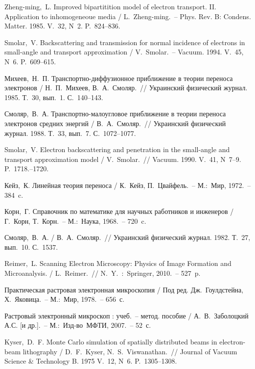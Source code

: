 \def\bibname{СИСОК ИСПОЛЬЗОВАННЫХ ИСТОЧНИКОВ}
\begin{thebibliography}{99}  

 Zheng-ming,~L. Improved bipartitition model of electron
transport. II. Application to inhomogeneoue media / L.~Zheng-ming.~-- Phys. Rev. B:
Condens. Matter. 1985. V.~32, N~2. P.~824--836.

 Smolar,~V. Backscattering and transmission for normal
incidence of electrons in small-angle and transport approximation /
V.~Smolar.~-- Vacuum. 1994. V.~45, N~6. P.~609--615.

 Михеев,~Н.~П. Транспортно-диффузионное приближение в теории
переноса электронов / Н.~П.~Михеев, В.~А.~Смоляр.~// Украинский физический
журнал. 1985. Т.~30, вып.~1. С.~140--143.

 Смоляр,~В.~А. Транспортно-малоугловое приближение в теории
переноса электронов средних энергий / В.~А.~Смоляр.~// Украинский физический
журнал. 1988. Т.~33, вып.~7. С.~1072--1077.

 Smolar,~V. Electron backscattering and penetration in the
small-angle and transport approximation model / V.~Smolar.~// Vacuum. 1990.
V.~41, N~7--9. P.~1718.--1720.

 Кейз,~К. Линейная теория переноса / К.~Кейз, П.~Цвайфель.~--
М.:~Мир, 1972.~-- 384~c.

 Корн,~Г. Справочник по математике для научных работников и
инженеров /  Г.~Корн, Т.~Корн.~-- М.:~Наука, 1968.~-- 720~c.

 Смоляр,~В.~А. / В.~А.~Смоляр.~// Украинский физический журнал.
1982. Т.~27, вып.~10. С.~1537. %


 Reimer,~L. Scanning Electron Microscopy: Physics of Image Formation
and Microanalysis. / L.~Reimer.~// N.~Y.~:~Springer, 2010.~-- 527~p.

 Практическая растровая электронная микроскопия / Под ред.
Дж.~Гоулдстейна, Х.~Яковица.~-- М.:~Мир, 1978.~-- 656~с.

 Растровый электронный микроскоп : учеб.~-- метод. пособие /
А.~В.~Заболоцкий А.С. [и др.].~-- М.:~Изд-во~МФТИ, 2007.~--
52~с. %

 Kyser,~D.~F. Monte Carlo simulation of spatially
distributed beams in electron-beam lithography / D.~F.~Kyser,
N.~S.~Viswanathan.~// Journal of Vacuum Science \& Technology B. 1975 V.~12,
N~6. P.~1305--1308.


\end{thebibliography}
